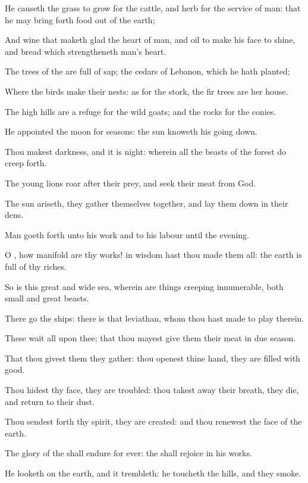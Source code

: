 \Verse He causeth the grass to grow for the cattle, and herb for the service of man: that he may bring forth food out of the earth;

\Verse And wine that maketh glad the heart of man, and oil to make his face to shine, and bread which strengtheneth man's heart.

\Verse The trees of the \LORD are full of sap; the cedars of Lebanon, which he hath planted;

\Verse Where the birds make their nests: as for the stork, the fir trees are her house.

\Verse The high hills are a refuge for the wild goats; and the rocks for the conies.

\Verse He appointed the moon for seasons: the sun knoweth his going down.

\Verse Thou makest darkness, and it is night: wherein all the beasts of the forest do creep forth.

\Verse The young lions roar after their prey, and seek their meat from God.

\Verse The sun ariseth, they gather themselves together, and lay them down in their dens.

\Verse Man goeth forth unto his work and to his labour until the evening.

\Verse O \LORD, how manifold are thy works! in wisdom hast thou made them all: the earth is full of thy riches.

\Verse So is this great and wide sea, wherein are things creeping innumerable, both small and great beasts.

\Verse There go the ships: there is that leviathan, whom thou hast made to play therein.

\Verse These wait all upon thee; that thou mayest give them their meat in due season.

\Verse That thou givest them they gather: thou openest thine hand, they are filled with good.

\Verse Thou hidest thy face, they are troubled: thou takest away their breath, they die, and return to their dust.

\Verse Thou sendest forth thy spirit, they are created: and thou renewest the face of the earth.

\Verse The glory of the \LORD shall endure for ever: the \LORD shall rejoice in his works.

\Verse He looketh on the earth, and it trembleth: he toucheth the hills, and they smoke.

